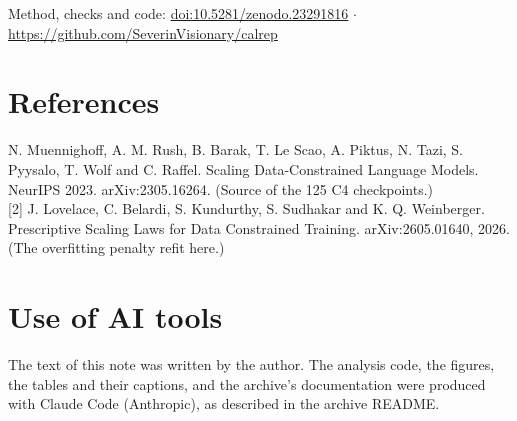 \documentclass[11pt]{article}
\begin{document}
Method, checks and code: \href{https://doi.org/10.5281/zenodo.23291816}{doi:10.5281/zenodo.23291816} $\cdot$ \url{https://github.com/SeverinVisionary/calrep}

\section*{References}
\small
\noindent[1] N. Muennighoff, A. M. Rush, B. Barak, T. Le Scao, A. Piktus, N. Tazi, S. Pyysalo, T. Wolf and C. Raffel. Scaling Data-Constrained Language Models. NeurIPS 2023. arXiv:2305.16264. (Source of the 125 C4 checkpoints.)\\
{}[2] J. Lovelace, C. Belardi, S. Kundurthy, S. Sudhakar and K. Q. Weinberger. Prescriptive Scaling Laws for Data Constrained Training. arXiv:2605.01640, 2026. (The overfitting penalty refit here.)

\section*{Use of AI tools}
The text of this note was written by the author. The analysis code, the figures, the tables and their captions, and the archive's documentation were produced with Claude Code (Anthropic), as described in the archive README.
\end{document}
